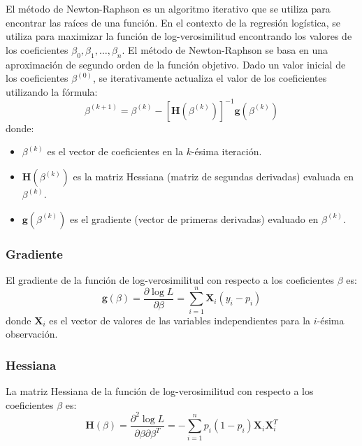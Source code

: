 El método de Newton-Raphson es un algoritmo iterativo que se utiliza para encontrar las raíces de una función. En el contexto de la regresión logística, se utiliza para maximizar la función de log-verosimilitud encontrando los valores de los coeficientes $\beta_0, \beta_1, \ldots, \beta_n$. El método de Newton-Raphson se basa en una aproximación de segundo orden de la función objetivo. Dado un valor inicial de los coeficientes $\beta^{(0)}$, se iterativamente actualiza el valor de los coeficientes utilizando la fórmula:
\begin{equation}
\beta^{(k+1)} = \beta^{(k)} - \left[ \mathbf{H}(\beta^{(k)}) \right]^{-1} \mathbf{g}(\beta^{(k)})
\end{equation}
donde:
\begin{itemize}
    \item $\beta^{(k)}$ es el vector de coeficientes en la $k$-ésima iteración.
    \item $\mathbf{H}(\beta^{(k)})$ es la matriz Hessiana (matriz de segundas derivadas) evaluada en $\beta^{(k)}$.
    \item $\mathbf{g}(\beta^{(k)})$ es el gradiente (vector de primeras derivadas) evaluado en $\beta^{(k)}$.
\end{itemize}

\subsubsection*{Gradiente}

El gradiente de la función de log-verosimilitud con respecto a los coeficientes $\beta$ es:
\begin{equation}
\mathbf{g}(\beta) = \frac{\partial \log L}{\partial \beta} = \sum_{i=1}^{n} \mathbf{X}_i (y_i - p_i)
\end{equation}
donde $\mathbf{X}_i$ es el vector de valores de las variables independientes para la $i$-ésima observación.

\subsubsection*{Hessiana}

La matriz Hessiana de la función de log-verosimilitud con respecto a los coeficientes $\beta$ es:
\begin{equation}
\mathbf{H}(\beta) = \frac{\partial^2 \log L}{\partial \beta \partial \beta^T} = -\sum_{i=1}^{n} p_i (1 - p_i) \mathbf{X}_i \mathbf{X}_i^T
\end{equation}

